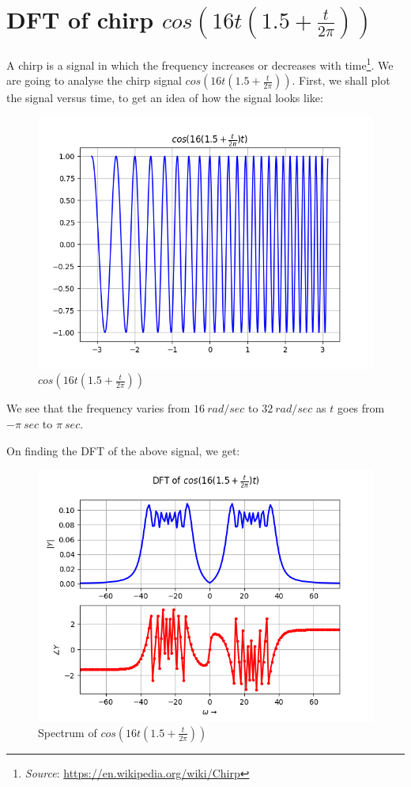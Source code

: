 \documentclass[11pt, a4paper, twoside]{article}
\begin{document}
\section{DFT of chirp $cos(16t(1.5 + \frac{t}{2\pi}))$}
    A chirp is a signal in which the frequency increases or decreases with time\footnote{\textit{Source}: \href{https://en.wikipedia.org/wiki/Chirp}{https://en.wikipedia.org/wiki/Chirp}}. We are going to analyse the chirp signal $cos(16t(1.5 + \frac{t}{2\pi}))$. First, we shall plot the signal versus time, to get an idea of how the signal looks like:
    \begin{figure}
        \centering
        \includegraphics[scale=0.5]{Fig6.png}
        \caption{$cos(16t(1.5 + \frac{t}{2\pi}))$}
        \label{fig:Fig6}
    \end{figure}
    
    We see that the frequency varies from $16\ rad/sec$ to $32\ rad/sec$ as $t$ goes from $-\pi \ sec$ to $\pi\ sec$.
    
    On finding the DFT of the above signal, we get:
    \begin{figure}
        \centering
        \includegraphics[scale=0.5]{Fig7.png}
        \caption{Spectrum of $cos(16t(1.5 + \frac{t}{2\pi}))$}
        \label{fig:Fig6}
    \end{figure}
    
\end{document}
